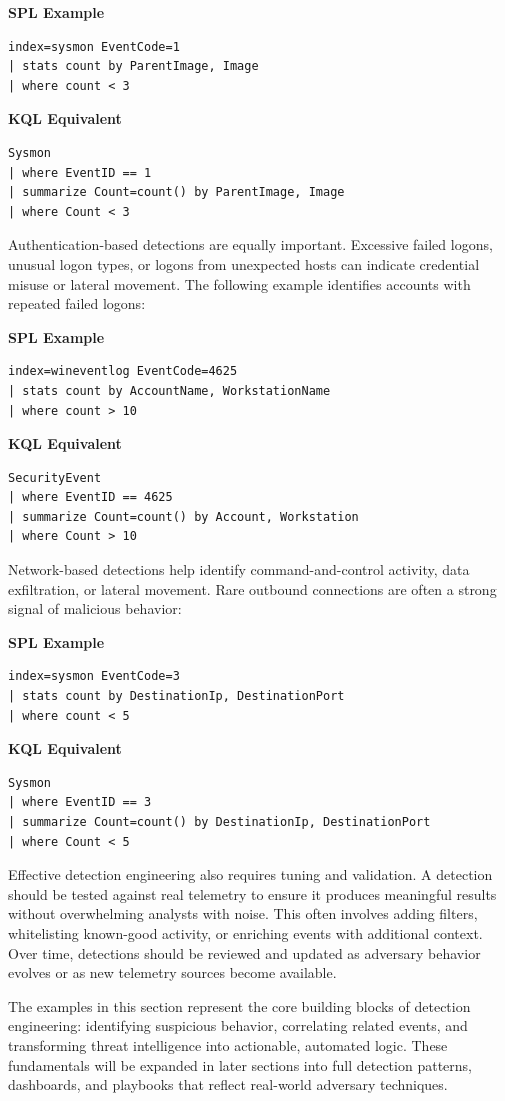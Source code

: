 \textbf{SPL Example}
\begin{lstlisting}
index=sysmon EventCode=1
| stats count by ParentImage, Image
| where count < 3
\end{lstlisting}

\textbf{KQL Equivalent}
\begin{lstlisting}
Sysmon
| where EventID == 1
| summarize Count=count() by ParentImage, Image
| where Count < 3
\end{lstlisting}

Authentication-based detections are equally important. Excessive failed logons, unusual logon types, or logons from unexpected 
hosts can indicate credential misuse or lateral movement. The following example identifies accounts with repeated failed logons:

\textbf{SPL Example}
\begin{lstlisting}
index=wineventlog EventCode=4625
| stats count by AccountName, WorkstationName
| where count > 10
\end{lstlisting}

\textbf{KQL Equivalent}
\begin{lstlisting}
SecurityEvent
| where EventID == 4625
| summarize Count=count() by Account, Workstation
| where Count > 10
\end{lstlisting}

Network-based detections help identify command-and-control activity, data exfiltration, or lateral movement. Rare outbound 
connections are often a strong signal of malicious behavior:

\textbf{SPL Example}
\begin{lstlisting}
index=sysmon EventCode=3
| stats count by DestinationIp, DestinationPort
| where count < 5
\end{lstlisting}

\textbf{KQL Equivalent}
\begin{lstlisting}
Sysmon
| where EventID == 3
| summarize Count=count() by DestinationIp, DestinationPort
| where Count < 5
\end{lstlisting}

Effective detection engineering also requires tuning and validation. A detection should be tested against real telemetry to 
ensure it produces meaningful results without overwhelming analysts with noise. This often involves adding filters, whitelisting 
known-good activity, or enriching events with additional context. Over time, detections should be reviewed and updated as 
adversary behavior evolves or as new telemetry sources become available.

The examples in this section represent the core building blocks of detection engineering: identifying suspicious behavior, 
correlating related events, and transforming threat intelligence into actionable, automated logic. These fundamentals will 
be expanded in later sections into full detection patterns, dashboards, and playbooks that reflect real-world adversary techniques.
